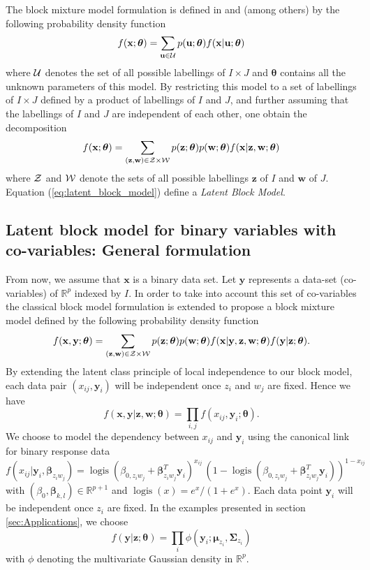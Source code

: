 \documentclass[a4paper]{article}
\DeclareMathOperator{\logis}{logis}
\newcommand{\R}{\mathbb{R}}
\newcommand{\Rp}{\mathbb{R}^p}
\newcommand{\calU}{{\cal U}}
\newcommand{\calW}{{\cal W}}
\newcommand{\calZ}{{\cal Z}}
\newcommand{\bu}{\mathbf{u}}
\newcommand{\bw}{\mathbf{w}}
\newcommand{\bx}{\mathbf{x}}
\newcommand{\by}{\mathbf{y}}
\newcommand{\bz}{\mathbf{z}}
\newcommand{\bbeta}{\boldsymbol{\beta}}
\newcommand{\bmu}{\boldsymbol{\mu}}
\newcommand{\bSigma}{\boldsymbol{\Sigma}}
\newcommand{\btheta}{\boldsymbol{\theta}}
\begin{document}
The block mixture model formulation is  defined in \cite{Govaert2003} and
\cite{bhatia2014blockcluster} (among others) by the following probability
density function
$$f(\bx;\btheta)=\sum_{\bu \in \calU} p(\bu;\btheta) f(\bx|\bu;\btheta)$$
where $\calU$ denotes the set of all possible labellings of $I\times J$
and $\btheta$ contains all the unknown parameters of this model. By
restricting this model to a set of labellings of $I\times J$ defined by a
product of labellings of $I$ and $J$, and further assuming that the
labellings of $I$ and $J$ are independent of each other, one obtain the
decomposition
\begin{equation}
  \label{eq:latent_block_model}
  f(\bx;\btheta)=\sum_{(\bz,\bw) \in \cal{Z \times W}}
  p(\bz;\btheta) p(\bw;\btheta) f(\bx|\bz,\bw;\btheta)
\end{equation}
where $\calZ$ and $\calW$ denote the sets of all possible labellings $\bz$
of $I$ and $\bw$ of $J$. Equation (\ref{eq:latent_block_model}) define a \emph{Latent Block Model}.

\subsection{Latent block model for binary variables with co-variables: General formulation}
\label{sec:Latent Block model}
From now, we assume that $\bx$ is a binary data set. Let $\by$ represents a data-set (co-variables) of $\R^p$ indexed by $I$.
In order to take into account this set of co-variables the classical
block model formulation is extended to propose a block mixture model
defined by the following probability density function
\begin{equation}
\label{eq:co_latent_block_model}
 f(\bx,\by;\btheta)=\sum_{(\bz,\bw) \in \cal{Z \times W}}p(\bz;\btheta) p(\bw;\btheta)
  f(\bx| \by,\bz,\bw;\btheta)  f(\by| \bz;\btheta).
\end{equation}
By extending the latent class principle of local independence to our block model, each data pair $(x_{ij},\by_i )$ will be independent once $z_i$ and
$w_j$ are fixed. Hence we have
$$f(\bx,\by|\bz,\bw;\btheta)=\prod_{i,j} f(x_{ij}, \by_{i};\btheta).$$
We choose to model the dependency between $x_{ij}$ and $\by_i$ using the canonical link for binary response data
\begin{equation}\label{eq:link}
f(x_{ij}|\by_i,\bbeta_{z_iw_j})= \logis(\beta_{0,z_iw_j}+\bbeta_{z_iw_j}^T\by_i)^{x_{ij}} \, \left(1-\logis(\beta_{0,z_iw_j}+\bbeta_{z_iw_j}^T\by_i)\right)^{1-{x_{ij}}}
\end{equation}
with $(\beta_0,\bbeta_{k,l})\in\R^{p+1}$ and $\logis(x) = e^x/(1+e^x)$.
Each data point $\by_i$ will be independent once $z_i$ are fixed.
In the examples presented in section \ref{sec:Applications}, we choose 
$$
f(\by|\bz;\btheta )=  \prod_{i} \phi(\by_i;\bmu_{z_i},\bSigma_{z_{i}})
$$
with $\phi$ denoting the multivariate Gaussian density in $\Rp$.
\end{document}
